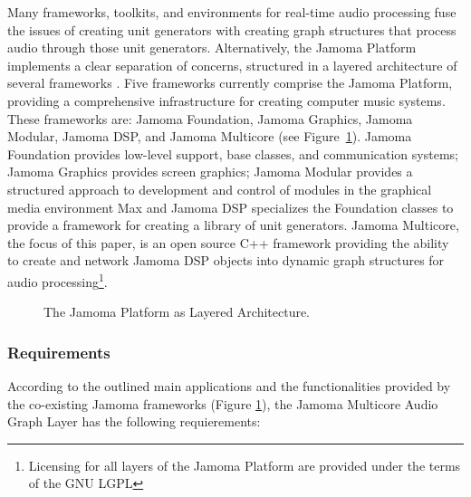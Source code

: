 \documentclass[twoside,a4paper]{article}
\begin{document}
Many frameworks, toolkits, and environments for real-time audio processing fuse the issues of creating unit generators with creating graph structures that process audio through those unit generators.  
Alternatively, the Jamoma Platform implements a clear separation of concerns, structured in a layered architecture of several frameworks \cite{Place:2010}.
 Five frameworks currently comprise the Jamoma Platform, providing a comprehensive infrastructure for creating computer music systems. 
 These frameworks are: Jamoma Foundation, Jamoma Graphics, Jamoma Modular, Jamoma DSP, and Jamoma Multicore (see Figure~\ref{fig:layers}). 
 Jamoma Foundation provides low-level support, base classes, and communication systems; Jamoma Graphics provides screen graphics; Jamoma Modular provides a structured approach to development and control of modules in the graphical media environment Max \cite{Place:2006} and Jamoma DSP specializes the Foundation classes to provide a framework for creating a library of unit generators. 
 Jamoma Multicore, the focus of this paper, is an open source C++ framework providing the ability to create and network Jamoma DSP objects into dynamic graph structures for audio processing\footnote{Licensing for all layers of the Jamoma Platform are provided under the terms of the GNU LGPL}.  


\begin{figure}[htbp]
\centerline{}
\caption{The Jamoma Platform as Layered Architecture.}
\label{fig:layers}
\end{figure}


\subsubsection{Requirements}
According to the outlined main applications and the functionalities provided by the co-existing Jamoma frameworks (Figure \ref{fig:layers}), the Jamoma Multicore Audio Graph Layer has the following requierements: 
\end{document}
